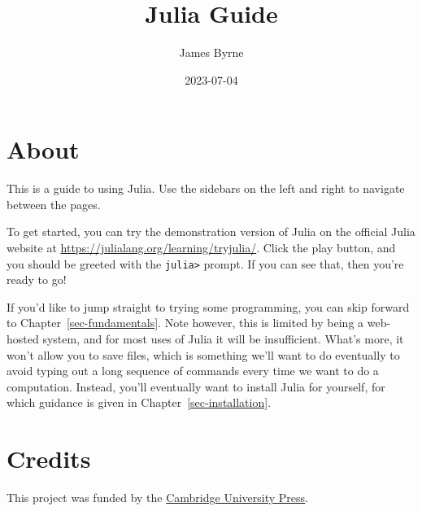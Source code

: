 \documentclass[
  letterpaper,
  DIV=11,
  numbers=noendperiod]{scrreprt}
\title{Julia Guide}
\author{James Byrne}
\date{2023-07-04}
\renewcommand*\contentsname{Table of contents}
\newcommand\contentsname{Table of contents}
\begin{document}
\maketitle
\ifdefined\Shaded\renewenvironment{Shaded}{\begin{tcolorbox}[enhanced, breakable, interior hidden, borderline west={3pt}{0pt}{shadecolor}, boxrule=0pt, frame hidden, sharp corners]}{\end{tcolorbox}}\fi

\renewcommand*\contentsname{Table of contents}
{
\hypersetup{linkcolor=}
\setcounter{tocdepth}{2}
\tableofcontents
}

\hypertarget{about}{%
\chapter*{About}\label{about}}


This is a guide to using Julia. Use the sidebars on the left and right
to navigate between the pages.

To get started, you can try the demonstration version of Julia on the
official Julia website at
\url{https://julialang.org/learning/tryjulia/}. Click the play button,
and you should be greeted with the \texttt{julia\textgreater{}} prompt.
If you can see that, then you're ready to go!

If you'd like to jump straight to trying some programming, you can skip
forward to Chapter~\ref{sec-fundamentals}. Note however, this is limited
by being a web-hosted system, and for most uses of Julia it will be
insufficient. What's more, it won't allow you to save files, which is
something we'll want to do eventually to avoid typing out a long
sequence of commands every time we want to do a computation. Instead,
you'll eventually want to install Julia for yourself, for which guidance
is given in Chapter~\ref{sec-installation}.


\hypertarget{credits}{%
\chapter*{Credits}\label{credits}}


This project was funded by the
\href{https://www.cambridge.org/}{Cambridge University Press}.
\end{document}
